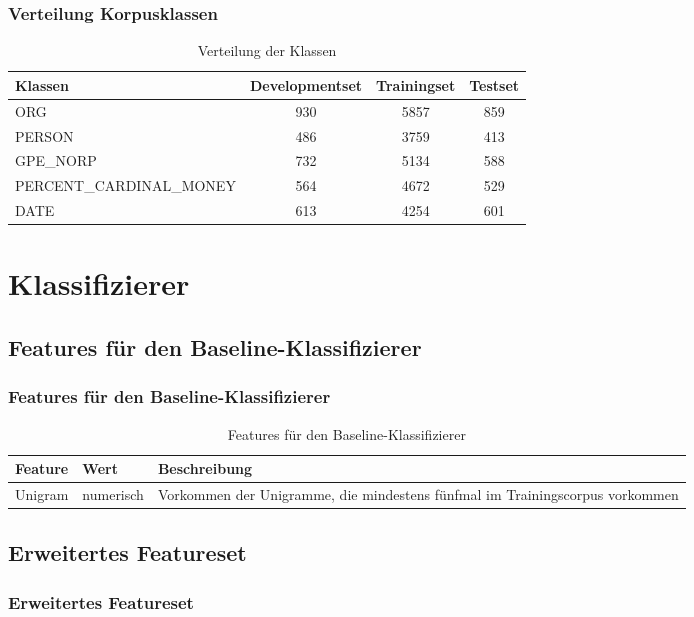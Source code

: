 \documentclass{beamer}
\begin{document}
	\begin{frame}
			\frametitle{Verteilung Korpusklassen}
			 \begin{table}
			 	\caption{Verteilung der Klassen}
			 	\begin{tabular}{lccc}
			 		\toprule
			 		Klassen  & Developmentset & Trainingset & Testset \\
			 		\midrule
			 		ORG  & 930 & 5857 & 859 \\
			 		PERSON & 486 & 3759 & 413 \\
			 		GPE\_NORP & 732 & 5134 & 588 \\
			 		PERCENT\_CARDINAL\_MONEY & 564 & 4672 & 529 \\
			 		DATE & 613 & 4254 & 601 \\
			 		\bottomrule
			 	\end{tabular}
			 	\label{tab:datasets}
			 \end{table}
	\end{frame}


\section{Klassifizierer}
	\subsection{Features für den Baseline-Klassifizierer}
	\begin{frame}
		\frametitle{Features für den Baseline-Klassifizierer}
					 \begin{table}
					 	\caption{Features für den Baseline-Klassifizierer}
					 	\begin{tabularx}{\textwidth}{llX}
					 		\toprule
							Feature & Wert & Beschreibung\\
					 		\midrule
					 		Unigram & numerisch & Vorkommen der Unigramme, die mindestens fünfmal im Trainingscorpus vorkommen \\
					 		\bottomrule
					 	\end{tabularx}
					 	\label{tab:datasets}
					 \end{table}
	\end{frame}
	\subsection{Erweitertes Featureset}
	\begin{frame}
		\frametitle{Erweitertes Featureset}
		
	\end{frame}
\end{document}
